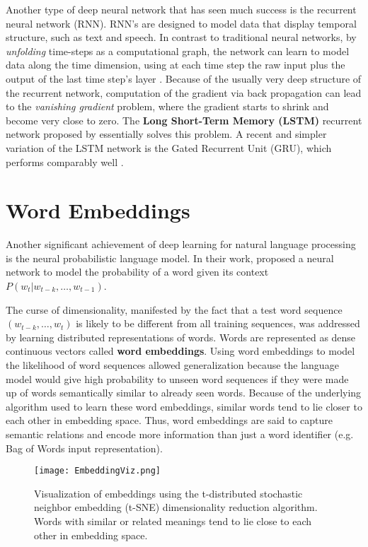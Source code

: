 Another type of deep neural network that has seen much success is the recurrent neural network (RNN). RNN's are designed to model data that display temporal structure, such as text and speech. In contrast to
traditional neural networks, by \textit{unfolding}
time-steps as a computational graph, the network can learn to model data along the time dimension, using at each time step the
raw input plus the output of the last time step's layer \cite{siegelmann1995computational}. Because of the usually very deep structure of
the recurrent network, computation of the gradient via back propagation can lead to the \textit{vanishing gradient} problem, where the gradient
starts to shrink and become very close to zero. The \textbf{Long Short-Term Memory (LSTM)} recurrent network proposed by \cite{hochreiter1997long} essentially solves this problem.
A recent and simpler variation of the LSTM network is the Gated Recurrent Unit (GRU), which performs comparably well \cite{chung2014empirical}.


\section{Word Embeddings}
Another significant achievement of deep learning for natural language processing is the neural probabilistic language model. In their work, \cite{bengio2003neural}
proposed a neural network to model the probability of a word given its context
$P(w_t|w_{t-k},\dots,w_{t-1})$.

The curse of dimensionality, manifested by the fact that a test word sequence $(w_{t-k},\dots,w_{t})$
is likely to be different from all training sequences, was addressed by learning distributed representations of words. Words are represented as
dense continuous vectors called \textbf{word embeddings}.
Using word embeddings to model the likelihood of word sequences allowed generalization because the language model
would give high probability to unseen word sequences if they were made up of words semantically similar to already seen words.
Because of the underlying algorithm used to learn these word embeddings, similar words tend to lie closer to each other in
embedding space. Thus, word embeddings are said to capture semantic relations and encode more information than just a word identifier (e.g.
Bag of Words input representation).

\begin{figure}[h]
\centering
\texttt{[image: EmbeddingViz.png]}
\caption{Visualization of embeddings using the t-distributed stochastic neighbor embedding (t-SNE) dimensionality reduction algorithm.
Words with similar or related meanings tend to lie close to each other in embedding space.}
\end{figure}

